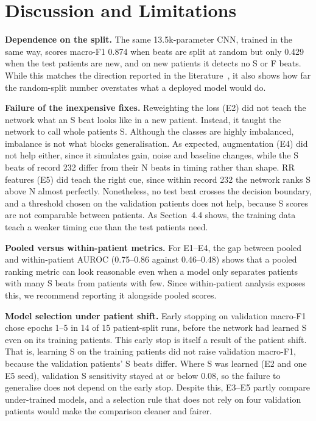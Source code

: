 \documentclass[10pt,a4paper]{article}
\begin{document}
\section{Discussion and Limitations}

\textbf{Dependence on the split.} The same 13.5k-parameter CNN, trained in the same way, scores macro-F1 0.874 when beats are split at random but only 0.429 when the test patients are new, and on new patients it detects no S or F beats. While this matches the direction reported in the literature~\cite{Mousavi2019,Sellami2019}, it also shows how far the random-split number overstates what a deployed model would do.

\textbf{Failure of the inexpensive fixes.} Reweighting the loss (E2) did not teach the network what an S beat looks like in a new patient. Instead, it taught the network to call whole patients S. Although the classes are highly imbalanced, imbalance is not what blocks generalisation. As expected, augmentation (E4) did not help either, since it simulates gain, noise and baseline changes, while the S beats of record 232 differ from their N beats in timing rather than shape. RR features (E5) did teach the right cue, since within record 232 the network ranks S above N almost perfectly. Nonetheless, no test beat crosses the decision boundary, and a threshold chosen on the validation patients does not help, because S scores are not comparable between patients. As Section~4.4 shows, the training data teach a weaker timing cue than the test patients need.

\textbf{Pooled versus within-patient metrics.} For E1–E4, the gap between pooled and within-patient AUROC (0.75–0.86 against 0.46–0.48) shows that a pooled ranking metric can look reasonable even when a model only separates patients with many S beats from patients with few. Since within-patient analysis exposes this, we recommend reporting it alongside pooled scores.

\textbf{Model selection under patient shift.} Early stopping on validation macro-F1 chose epochs 1–5 in 14 of 15 patient-split runs, before the network had learned S even on its training patients. This early stop is itself a result of the patient shift. That is, learning S on the training patients did not raise validation macro-F1, because the validation patients' S beats differ. Where S was learned (E2 and one E5 seed), validation S sensitivity stayed at or below 0.08, so the failure to generalise does not depend on the early stop. Despite this, E3–E5 partly compare under-trained models, and a selection rule that does not rely on four validation patients would make the comparison cleaner and fairer.
\end{document}

